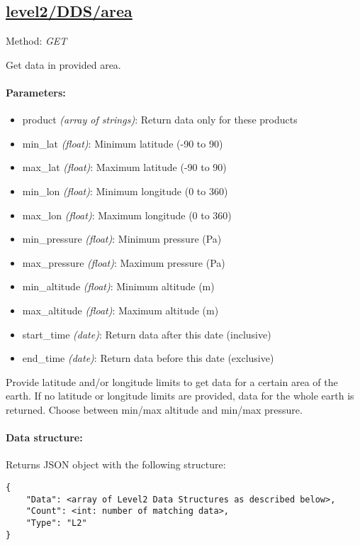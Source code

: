 \subsection{\url{level2/DDS/area}}
\label{apt:area}
Method: \emph{GET}

Get data in provided area.

\paragraph{Parameters:}
\begin{itemize}
    \item product \emph{(array of strings)}: Return data only for these
        products
    \item min\_lat \emph{(float)}: Minimum latitude (-90 to 90)
    \item max\_lat \emph{(float)}: Maximum latitude (-90 to 90)
    \item min\_lon \emph{(float)}: Minimum longitude (0 to 360)
    \item max\_lon \emph{(float)}: Maximum longitude (0 to 360)
    \item min\_pressure \emph{(float)}: Minimum pressure (Pa)
    \item max\_pressure \emph{(float)}: Maximum pressure (Pa)
    \item min\_altitude \emph{(float)}: Minimum altitude (m)
    \item max\_altitude \emph{(float)}: Maximum altitude (m)
    \item start\_time \emph{(date)}: Return data after this date (inclusive)
    \item end\_time \emph{(date)}: Return data before this date (exclusive)
\end{itemize}

Provide latitude and/or longitude limits to get data for a certain area of the
earth. If no latitude or longitude limits are provided, data for the whole
earth is returned. Choose between min/max altitude and min/max pressure.

\paragraph{Data structure:}
Returns JSON object with the following structure:

\begin{lstlisting}
{
	"Data": <array of Level2 Data Structures as described below>,
	"Count": <int: number of matching data>,
	"Type": "L2"
}
\end{lstlisting}


